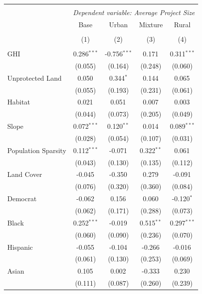 \begin{table}[!htbp] \centering
\begin{tabular}{@{\extracolsep{5pt}}lcccc}
\\[-1.8ex]\hline
\hline \\[-1.8ex]
& \multicolumn{4}{c}{\textit{Dependent variable: Average Project Size}} \
\cr \cline{2-5}
\\[-1.8ex] & \multicolumn{1}{c}{Base} & \multicolumn{1}{c}{Urban} & \multicolumn{1}{c}{Mixture} & \multicolumn{1}{c}{Rural}  \\
\\[-1.8ex] & (1) & (2) & (3) & (4) \\
\hline \\[-1.8ex]
 GHI & 0.286$^{***}$ & -0.756$^{***}$ & 0.171$^{}$ & 0.311$^{***}$ \\
& (0.055) & (0.164) & (0.248) & (0.060) \\
 Unprotected Land & 0.050$^{}$ & 0.344$^{*}$ & 0.144$^{}$ & 0.065$^{}$ \\
& (0.055) & (0.193) & (0.231) & (0.061) \\
 Habitat & 0.021$^{}$ & 0.051$^{}$ & 0.007$^{}$ & 0.003$^{}$ \\
& (0.044) & (0.073) & (0.205) & (0.049) \\
 Slope & 0.072$^{***}$ & 0.120$^{**}$ & 0.014$^{}$ & 0.089$^{***}$ \\
& (0.028) & (0.054) & (0.107) & (0.031) \\
 Population Sparsity & 0.112$^{***}$ & -0.071$^{}$ & 0.322$^{**}$ & 0.061$^{}$ \\
& (0.043) & (0.130) & (0.135) & (0.112) \\
 Land Cover & -0.045$^{}$ & -0.350$^{}$ & 0.279$^{}$ & -0.091$^{}$ \\
& (0.076) & (0.320) & (0.360) & (0.084) \\
 Democrat & -0.062$^{}$ & 0.156$^{}$ & 0.060$^{}$ & -0.120$^{*}$ \\
& (0.062) & (0.171) & (0.288) & (0.073) \\
 Black & 0.252$^{***}$ & -0.019$^{}$ & 0.515$^{**}$ & 0.297$^{***}$ \\
& (0.060) & (0.090) & (0.236) & (0.070) \\
 Hispanic & -0.055$^{}$ & -0.104$^{}$ & -0.266$^{}$ & -0.016$^{}$ \\
& (0.061) & (0.130) & (0.253) & (0.069) \\
 Asian & 0.105$^{}$ & 0.002$^{}$ & -0.333$^{}$ & 0.230$^{}$ \\
& (0.111) & (0.087) & (0.260) & (0.239) \\

\end{tabular}
\end{table}

